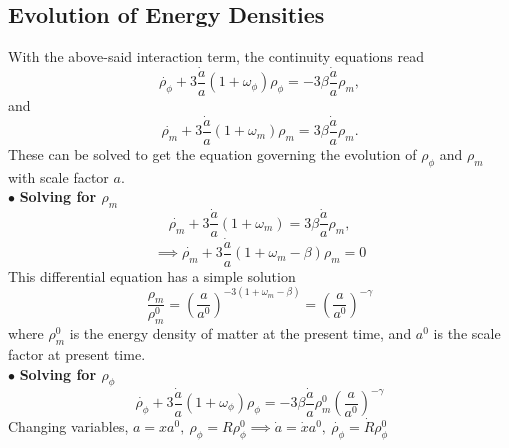 \documentclass[preprint,aps,floatfix]{revtex4}
\def\nn{\nonumber}
\begin{document}
\subsection{Evolution of Energy Densities}
\label{sec: energydensity}
\noindent    
    With the above-said interaction term, the continuity equations read
    \begin{equation}\label{eq:ce1}
        \dot{\rho_\phi} + 3\frac{\dot{a}}{a}(1 + \omega_\phi)\rho_\phi = -3\beta \frac{\dot{a}}{a}\rho_m,
    \end{equation}
    and
    \begin{equation}\label{eq:ce2}
        \dot{\rho_m} + 3\frac{\dot{a}}{a}(1 + \omega_m)\rho_m = 3\beta\frac{\dot{a}}{a}\rho_m.
    \end{equation}
    These can be solved to get the equation governing the evolution of $\rho_\phi$ and $\rho_m$ with scale factor $a$.\\
%
%
\noindent
    $\bullet$ \textbf{Solving for $\rho_m$}
    \begin{equation}
        \dot{\rho_m} + 3\frac{\dot{a}}{a}(1+\omega_m) = 3\beta \displaystyle\frac{\dot{a}}{a}\rho_m, \nn
    \end{equation}
    \begin{equation}
        \implies \dot{\rho_m} + 3\frac{\dot{a}}{a}(1+\omega_m - \beta)\rho_m = 0
    \end{equation}
    This differential equation has a simple solution
    \begin{equation} \label{eq:DensityEvolutionMatter}
        \frac{\rho_m}{\rho_m^0} = \left(\frac{a}{a^0}\right)^{-3(1+\omega_m - \beta)}=  \left(\frac{a}{a^0}\right)^{-\gamma}
    \end{equation}
    where $\rho_m^0$ is the energy density of matter at the present time, and $a^0$ is the scale factor at present time.\\
    
    \noindent
    $\bullet$ \textbf{Solving for $\rho_\phi$}
    \begin{equation}
        \dot{\rho_\phi} + 3\frac{\dot{a}}{a}(1+\omega_\phi)\rho_\phi = -3\beta \displaystyle\frac{\dot{a}}{a}\rho_m^0 \left( \frac{a}{a^0} \right)^{-\gamma}
    \end{equation}
    Changing variables, $a = xa^0, ~\rho_\phi = R\rho_\phi^0 \implies \dot{a} = \dot{x}a^0,~ \dot{\rho_\phi} = \dot{R}\rho_\phi^0$
\end{document}
